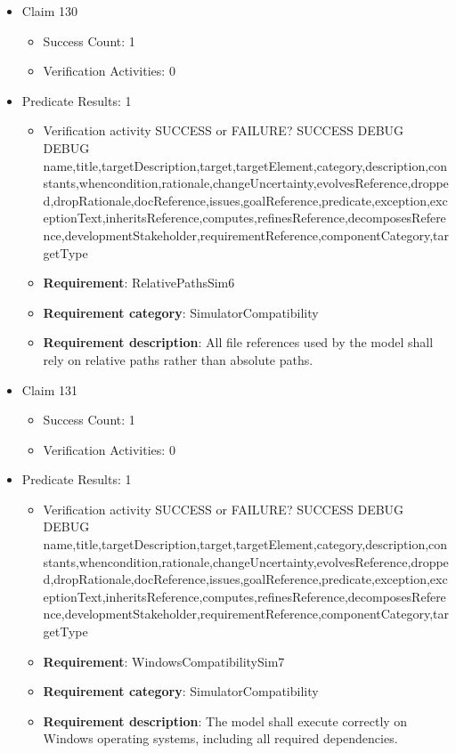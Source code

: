 \documentclass{article}
\begin{document}
\begin{itemize}
  				  \item Claim 130
				\begin{itemize}
			    	\item Success Count: 1 
			    	\item Verification Activities: 0
				\end{itemize}
				
									    
				\item Predicate Results: 1
					\begin{itemize}				
					\item Verification activity SUCCESS or FAILURE? SUCCESS
					DEBUG DEBUG name,title,targetDescription,target,targetElement,category,description,constants,whencondition,rationale,changeUncertainty,evolvesReference,dropped,dropRationale,docReference,issues,goalReference,predicate,exception,exceptionText,inheritsReference,computes,refinesReference,decomposesReference,developmentStakeholder,requirementReference,componentCategory,targetType
					\item \textbf{Requirement}: RelativePathsSim6 
					\item \textbf{Requirement category}: SimulatorCompatibility
					\item \textbf{Requirement description}: All file references used by the model shall rely on relative paths rather than absolute paths.
					\end{itemize}

  				  \item Claim 131
				\begin{itemize}
			    	\item Success Count: 1 
			    	\item Verification Activities: 0
				\end{itemize}
				
									    
				\item Predicate Results: 1
					\begin{itemize}				
					\item Verification activity SUCCESS or FAILURE? SUCCESS
					DEBUG DEBUG name,title,targetDescription,target,targetElement,category,description,constants,whencondition,rationale,changeUncertainty,evolvesReference,dropped,dropRationale,docReference,issues,goalReference,predicate,exception,exceptionText,inheritsReference,computes,refinesReference,decomposesReference,developmentStakeholder,requirementReference,componentCategory,targetType
					\item \textbf{Requirement}: WindowsCompatibilitySim7 
					\item \textbf{Requirement category}: SimulatorCompatibility
					\item \textbf{Requirement description}: The model shall execute correctly on Windows operating systems, including all required dependencies.
					\end{itemize}

			\end{itemize}

		
\end{document}
